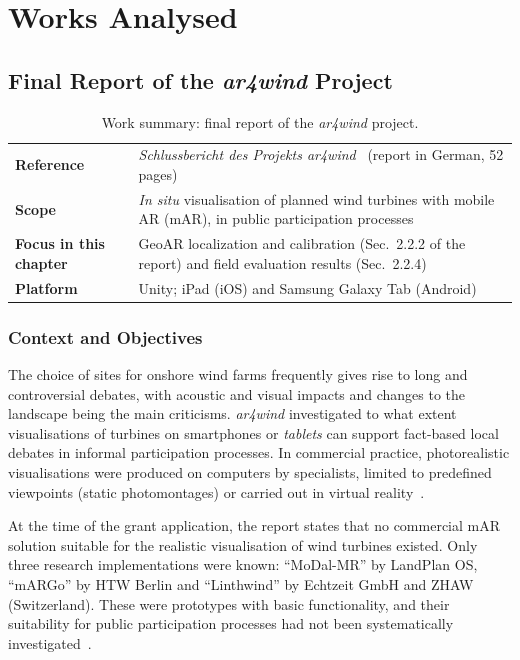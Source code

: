 \section{Works Analysed}
\label{sec:sota_trabalhos}

\subsection{Final Report of the \textit{ar4wind} Project}
\label{sec:ar4wind}

\begin{table}[htbp]
\centering
\caption{Work summary: final report of the \textit{ar4wind} project.}
\label{tab:ficha_ar4wind}
\small
\begin{tabular}{p{3.2cm}p{9.8cm}}
\hline
\textbf{Reference} & \textit{Schlussbericht des Projekts ar4wind}~\cite{ar4wind2023} (report in German, 52 pages) \\
\textbf{Scope} & \textit{In situ} visualisation of planned wind turbines with mobile AR (mAR), in public participation processes \\
\textbf{Focus in this chapter} & GeoAR localization and calibration (Sec.~2.2.2 of the report) and field evaluation results (Sec.~2.2.4) \\
\textbf{Platform} & Unity; iPad (iOS) and Samsung Galaxy Tab (Android) \\
\hline
\end{tabular}
\end{table}

\subsubsection{Context and Objectives}

The choice of sites for onshore wind farms frequently gives rise to long and controversial debates, with acoustic and visual impacts and changes to the landscape being the main criticisms. \textit{ar4wind} investigated to what extent visualisations of turbines on smartphones or \textit{tablets} can support fact-based local debates in informal participation processes. In commercial practice, photorealistic visualisations were produced on computers by specialists, limited to predefined viewpoints (static photomontages) or carried out in virtual reality~\cite[Sec.~1.1 and 1.2]{ar4wind2023}.

At the time of the grant application, the report states that no commercial mAR solution suitable for the realistic visualisation of wind turbines existed. Only three research implementations were known: ``MoDal-MR'' by LandPlan OS, ``mARGo'' by HTW Berlin and ``Linthwind'' by Echtzeit GmbH and ZHAW (Switzerland). These were prototypes with basic functionality, and their suitability for public participation processes had not been systematically investigated~\cite[Sec.~1.2]{ar4wind2023}.

